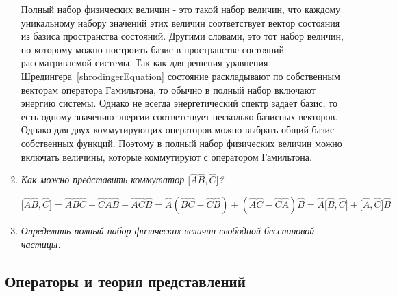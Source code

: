 \documentclass{article}
\begin{document}
\begin{enumerate}
	Полный набор физических величин - это такой набор величин, что каждому уникальному набору значений этих величин соответствует вектор состояния из базиса пространства состояний. Другими словами, это тот набор величин, по которому можно построить базис в пространстве состояний рассматриваемой системы. Так как для решения уравнения Шредингера~\eqref{shrodingerEquation} состояние раскладывают по собственным векторам оператора Гамильтона, то обычно в полный набор включают энергию системы. Однако не всегда энергетический спектр задает базис, то есть одному значению энергии соответствует несколько базисных векторов. Однако для двух коммутирующих операторов можно выбрать общий базис собственных функций. Поэтому в полный набор физических величин можно включать величины, которые коммутируют с оператором Гамильтона.
	
	\item \textit{
		Как можно представить коммутатор $\Big[ \hat{A} \hat{B}, \hat{C}\Big]$?	
	}
	
	\begin{equation}
		\Big[ \hat{A} \hat{B}, \hat{C}\Big] = \hat{A}\hat{B}\hat{C} - \hat{C}\hat{A}\hat{B} \pm \hat{A} \hat{C} \hat{B} = \hat{A}(\hat{B}\hat{C} - \hat{C} \hat{B}) + (\hat{A}\hat{C} - \hat{C} \hat{A}) \hat{B} = \hat{A}\Big[ \hat{B}, \hat{C}\Big] + \Big[ \hat{A}, \hat{C}\Big] \hat{B} \label{abc}
	\end{equation}
	
	\item \textit{Определить полный набор физических величин свободной бесспиновой частицы.}

\end{enumerate}

\subsection*{Операторы и теория представлений}
\end{document}
